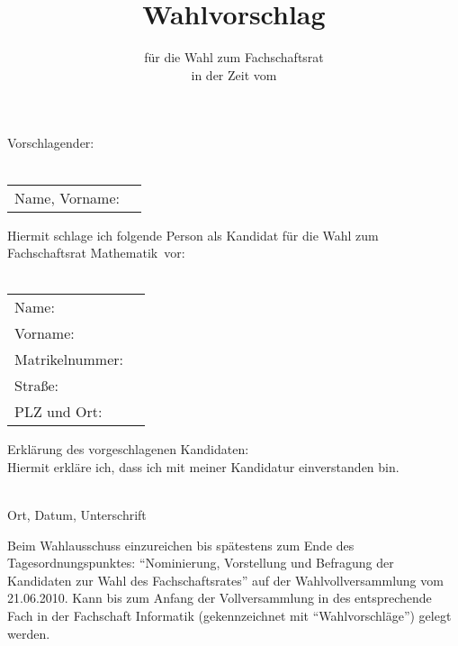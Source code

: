 \documentclass[a4paper,10pt]{scrartcl}
\title{Wahlvorschlag}
\subtitle{für die Wahl zum Fachschaftsrat \fach \\ in der Zeit vom \zeit}
\date{}
\def\fach{Mathematik}
\def\wahlvvDatum{21.06.2010}
\begin{document}
\pagestyle{empty}
\thispagestyle{empty}
\renewcommand{\titlepagestyle}{empty}

\maketitle

Vorschlagender:
\\
\vspace{0.5cm}\\
\begin{tabularx}{\textwidth}{lX}
Name, Vorname: & \underline{\hspace{10cm}} \vspace{0.5cm}\\
\end{tabularx}
Hiermit schlage ich folgende Person als Kandidat für die Wahl zum Fachschaftsrat \fach~vor:\\
\vspace{0.5cm}\\
\begin{tabularx}{\textwidth}{lX}
Name: & \underline{\hspace{10cm}} \vspace{0.5cm}\\
Vorname:  & \underline{\hspace{10cm}} \vspace{0.5cm}\\
Matrikelnummer: & \underline{\hspace{10cm}} \vspace{0.5cm}\\ 
Straße:  & \underline{\hspace{10cm}} \vspace{0.5cm}\\
PLZ und Ort: & \underline{\hspace{10cm}} \vspace{0.5cm}\\
\end{tabularx}          
Erklärung des vorgeschlagenen Kandidaten:\\
Hiermit erkläre ich, dass ich mit meiner Kandidatur einverstanden bin.
\vspace{0.5cm}

\underline{\hspace{10cm}}\\
Ort, Datum, Unterschrift

Beim Wahlausschuss einzureichen bis spätestens zum Ende des Tagesordnungspunktes:
``Nominierung, Vorstellung und Befragung der Kandidaten zur Wahl des Fachschaftsrates'' auf
der Wahlvollversammlung vom \wahlvvDatum.
Kann bis zum Anfang der Vollversammlung in des entsprechende Fach in der Fachschaft Informatik
(gekennzeichnet mit ``Wahlvorschläge'') gelegt werden.
\end{document}
